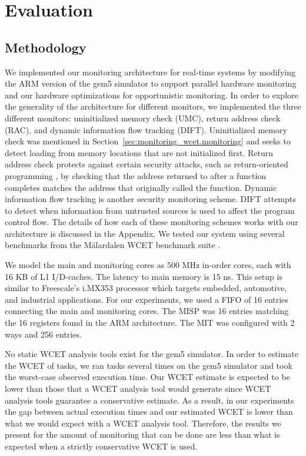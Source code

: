 \section{Evaluation}
\label{sec:monitoring_hard_drop.evaluation}

\subsection{Methodology} 
\label{sec:monitoring_hard_drop.evaluation.methodology}

We implemented our monitoring architecture for real-time systems by modifying
the ARM version of the gem5 simulator \cite{gem5} to support parallel hardware
monitoring and our hardware optimizations for opportunistic monitoring. In
order to explore the generality of the architecture for different monitors, we
implemented the three different monitors: uninitialized memory check (UMC),
return address check (RAC), and dynamic information flow tracking (DIFT).
Uninitialized memory check was mentioned in
Section~\ref{sec:monitoring_wcet.monitoring} and seeks to detect loading from
memory locations that are not initialized first. Return address check protects
against certain security attacks, such as return-oriented programming
\cite{shacham-rop-ccs07}, by checking that the address returned to after a
function completes matches the address that originally called the function.
Dynamic information flow tracking is another security monitoring scheme. DIFT
attempts to detect when information from untrusted sources is used to affect
the program control flow. The details of how each of these monitoring schemes
works with our architecture is discussed in the Appendix. We tested our system
using several benchmarks from the M{\"a}lardalen WCET benchmark suite
\cite{malardalen}. 

We model the main and monitoring cores as 500 MHz in-order cores, each with 16
KB of L1 I/D-caches. The latency to main memory is 15 ns. This setup is
similar to Freescale's i.MX353 processor which targets embedded, automotive,
and industrial applications. For our experiments, we used a FIFO of 16 entries
connecting the main and monitoring cores. The MISP was 16 entries matching the
16 registers found in the ARM architecture. The MIT was configured with 2 ways
and 256 entries. 

No static WCET analysis tools exist for the gem5 simulator. In order to
estimate the WCET of tasks, we ran tasks several times on the gem5 simulator
and took the worst-case observed execution time. Our WCET estimate is expected
to be lower than those that a WCET analysis tool would generate since WCET
analysis tools guarantee a conservative estimate. As a result, in our
experiments the gap between actual execution times and our estimated WCET is
lower than what we would expect with a WCET analysis tool. Therefore, the
results we present for the amount of monitoring that can be done are less than
what is expected when a strictly conservative WCET is used.

